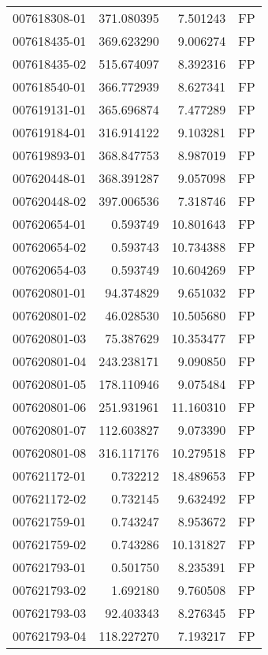 \begin{tabular}{lrrl}
007618308-01 &  371.080395 &       7.501243 &   FP \\
007618435-01 &  369.623290 &       9.006274 &   FP \\
007618435-02 &  515.674097 &       8.392316 &   FP \\
007618540-01 &  366.772939 &       8.627341 &   FP \\
007619131-01 &  365.696874 &       7.477289 &   FP \\
007619184-01 &  316.914122 &       9.103281 &   FP \\
007619893-01 &  368.847753 &       8.987019 &   FP \\
007620448-01 &  368.391287 &       9.057098 &   FP \\
007620448-02 &  397.006536 &       7.318746 &   FP \\
007620654-01 &    0.593749 &      10.801643 &   FP \\
007620654-02 &    0.593743 &      10.734388 &   FP \\
007620654-03 &    0.593749 &      10.604269 &   FP \\
007620801-01 &   94.374829 &       9.651032 &   FP \\
007620801-02 &   46.028530 &      10.505680 &   FP \\
007620801-03 &   75.387629 &      10.353477 &   FP \\
007620801-04 &  243.238171 &       9.090850 &   FP \\
007620801-05 &  178.110946 &       9.075484 &   FP \\
007620801-06 &  251.931961 &      11.160310 &   FP \\
007620801-07 &  112.603827 &       9.073390 &   FP \\
007620801-08 &  316.117176 &      10.279518 &   FP \\
007621172-01 &    0.732212 &      18.489653 &   FP \\
007621172-02 &    0.732145 &       9.632492 &   FP \\
007621759-01 &    0.743247 &       8.953672 &   FP \\
007621759-02 &    0.743286 &      10.131827 &   FP \\
007621793-01 &    0.501750 &       8.235391 &   FP \\
007621793-02 &    1.692180 &       9.760508 &   FP \\
007621793-03 &   92.403343 &       8.276345 &   FP \\
007621793-04 &  118.227270 &       7.193217 &   FP \\

\end{tabular}
